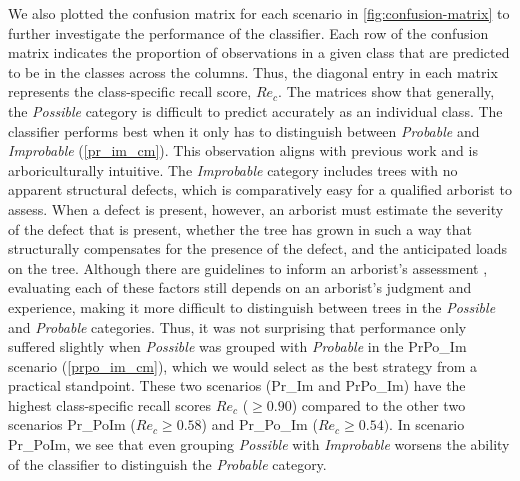 \documentclass[NewProceedindgs, NoLineNumbers, SectionNumbers, letterpaper, SingleSpace, InsideFigs]{ascelike-new}
\begin{document}
We also plotted the confusion matrix for each scenario in \autoref{fig:confusion-matrix} to further investigate the
performance of the classifier.  Each row of the confusion matrix indicates the proportion of observations in a given
class that are predicted to be in the classes across the columns.  Thus, the diagonal entry in each matrix represents
the class-specific recall score, $Re_{c}$.  The matrices show that generally, the \textit{Possible} category is
difficult to predict accurately as an individual class.  The classifier performs best when it only has to distinguish
between \textit{Probable} and \textit{Improbable} (\autoref{pr_im_cm}). This observation aligns with previous work \cite{koeser2020can} and is arboriculturally intuitive. The \textit{Improbable} category includes trees with no apparent structural defects, which is comparatively easy for a qualified arborist to assess. When a defect is present, however, an arborist must estimate the severity of the defect that is present, whether the tree has grown in such a way that structurally compensates for the presence of the defect, and the anticipated loads on the tree. Although there are guidelines to inform an arborist's assessment \cite{smiley2017best,goodfellow2020best}, evaluating each of these factors still depends on an arborist's judgment and experience, making it more difficult to distinguish between trees in the \textit{Possible} and \textit{Probable} categories. Thus, it was not surprising that performance only suffered slightly when
\textit{Possible} was grouped with \textit{Probable} in the PrPo\_Im scenario (\autoref{prpo_im_cm}), which we would
select as the best strategy from a practical standpoint.  These two scenarios (Pr\_Im and PrPo\_Im) have the highest
class-specific recall scores $Re_{c}$ ($\ge 0.90$) compared to the other two scenarios Pr\_PoIm ($Re_{c} \ge 0.58$) and
Pr\_Po\_Im ($Re_{c} \ge 0.54)$. In scenario Pr\_PoIm, we see that even grouping \textit{Possible} with
\textit{Improbable} worsens the ability of the classifier to distinguish the \textit{Probable} category.
\end{document}

